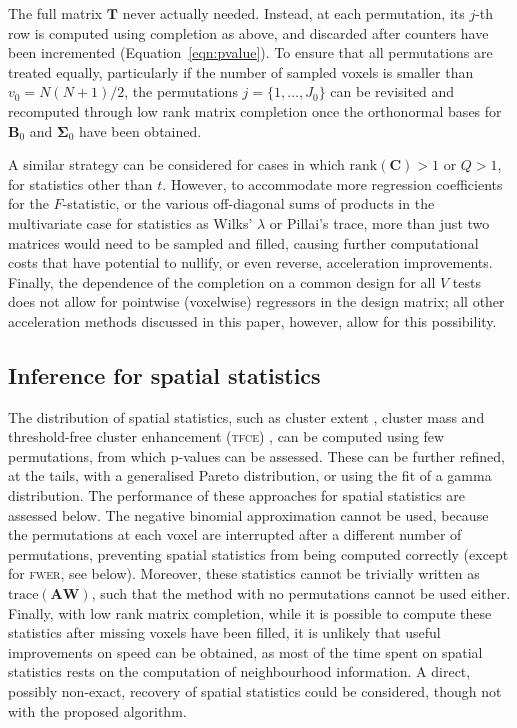 The full matrix $\mathbf{T}$ never actually needed. Instead, at each permutation, its $j$-th row is computed using completion as above, and discarded after counters have been incremented (Equation~\ref{eqn:pvalue}). To ensure that all permutations are treated equally, particularly if the number of sampled voxels is smaller than  $v_0 = N(N+1)/2$, the permutations $j=\{1,\ldots,J_0\}$ can be revisited and recomputed through low rank matrix completion once the orthonormal bases for $\mathbf{B}_0$ and $\boldsymbol{\Sigma}_0$ have been obtained.

A similar strategy can be considered for cases in which $\text{rank}(\mathbf{C}) > 1$ or $Q>1$, for statistics other than $t$. However, to accommodate more regression coefficients for the $F$-statistic, or the various off-diagonal sums of products in the multivariate case for statistics as Wilks' $\lambda$ or Pillai's trace, more than just two matrices would need to be sampled and filled, causing further computational costs that have potential to nullify, or even reverse, acceleration improvements. Finally, the dependence of the completion on a common design for all $V$ tests does not allow for pointwise (voxelwise) regressors in the design matrix; all other acceleration methods discussed in this paper, however, allow for this possibility.

\subsection{Inference for spatial statistics}
\label{sec:accel:spatial}

The distribution of spatial statistics, such as cluster extent \citep{Friston1994}, cluster mass \citep{Poline1997, Bullmore1999} and threshold-free cluster enhancement (\textsc{tfce}) \citep{Smith2009}, can be computed using few permutations, from which p-values can be assessed. These can be further refined, at the tails, with a generalised Pareto distribution, or using the fit of a gamma distribution. The performance of these approaches for spatial statistics are assessed below. The negative binomial approximation cannot be used, because the permutations at each voxel are interrupted after a different number of permutations, preventing spatial statistics from being computed correctly (except for \textsc{fwer}, see below). Moreover, these statistics cannot be trivially written as $\text{trace}(\mathbf{A}\mathbf{W})$, such that the method with no permutations cannot be used either. Finally, with low rank matrix completion, while it is possible to compute these statistics after missing voxels have been filled, it is unlikely that useful improvements on speed can be obtained, as most of the time spent on spatial statistics rests on the computation of neighbourhood information. A direct, possibly non-exact, recovery of spatial statistics could be considered, though not with the proposed algorithm.

